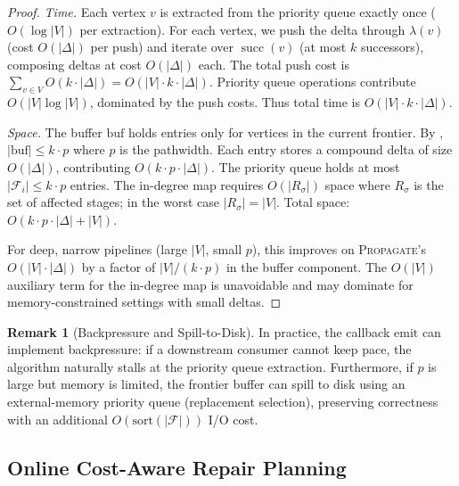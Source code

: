 \documentclass[11pt,a4paper]{article}
\theoremstyle{definition}
\newtheorem{remark}[theorem]{Remark}
\DeclareMathOperator{\succ}{succ}
\begin{document}
\begin{proof}
\emph{Time.}  Each vertex $v$ is extracted from the priority queue exactly
once ($O(\log |V|)$ per extraction).  For each vertex, we push the delta
through $\lambda(v)$ (cost $O(|\Delta|)$ per push) and iterate over
$\succ(v)$ (at most $k$ successors), composing deltas at cost
$O(|\Delta|)$ each.  The total push cost is $\sum_{v \in V} O(k \cdot |\Delta|)
= O(|V| \cdot k \cdot |\Delta|)$.  Priority queue operations contribute
$O(|V| \log |V|)$, dominated by the push costs.  Thus total time is
$O(|V| \cdot k \cdot |\Delta|)$.

\emph{Space.}  The buffer $\mathrm{buf}$ holds entries only for vertices in
the current frontier.  By ,
$|\mathrm{buf}| \leq k \cdot p$ where $p$ is the pathwidth.  Each entry
stores a compound delta of size $O(|\Delta|)$, contributing
$O(k \cdot p \cdot |\Delta|)$.  The priority queue holds at most
$|\mathcal{F}_i| \leq k \cdot p$ entries.  The in-degree map requires
$O(|R_\sigma|)$ space where $R_\sigma$ is the set of affected stages;
in the worst case $|R_\sigma| = |V|$.  Total space:
$O(k \cdot p \cdot |\Delta| + |V|)$.

For deep, narrow pipelines (large $|V|$, small $p$), this improves on
\textsc{Propagate}'s $O(|V| \cdot |\Delta|)$ by a factor of
$|V| / (k \cdot p)$ in the buffer component.  The $O(|V|)$ auxiliary term
for the in-degree map is unavoidable and may dominate for memory-constrained
settings with small deltas.
\end{proof}

\begin{remark}[Backpressure and Spill-to-Disk]
In practice, the callback $\mathrm{emit}$ can implement backpressure:
if a downstream consumer cannot keep pace, the algorithm naturally stalls at
the priority queue extraction.  Furthermore, if $p$ is large but memory is
limited, the frontier buffer can spill to disk using an external-memory
priority queue (replacement selection), preserving correctness with an
additional $O(\mathrm{sort}(|\mathcal{F}|))$ I/O cost.
\end{remark}


\subsection{Online Cost-Aware Repair Planning}
\label{sec:adaptive-repair}
\end{document}
